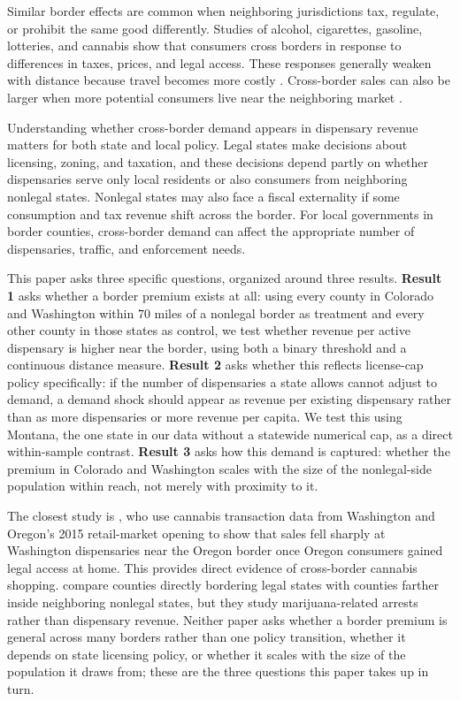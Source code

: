 \documentclass[12pt]{article}
\begin{document}
Similar border effects are common when neighboring jurisdictions tax, regulate, or prohibit the same good
differently. Studies of alcohol, cigarettes, gasoline, lotteries, and cannabis show that consumers cross
borders in response to differences in taxes, prices, and legal access. These responses generally weaken with
distance because travel becomes more costly \citep{AsplundFribergWilander2007,Lovenheim2008,BeattyLarsenSommervoll2009,ChandraHeadTappata2014,HansenMillerWeber2020}.
Cross-border sales can also be larger when more potential consumers live near the neighboring market
\citep{KnightSchiff2012,ChandraHeadTappata2014}.

Understanding whether cross-border demand appears in dispensary revenue matters for both state and local
policy. Legal states make decisions about licensing, zoning, and taxation, and these decisions depend partly
on whether dispensaries serve only local residents or also consumers from neighboring nonlegal states.
Nonlegal states may also face a fiscal externality if some consumption and tax revenue shift across the
border. For local governments in border counties, cross-border demand can affect the appropriate number of
dispensaries, traffic, and enforcement needs.

This paper asks three specific questions, organized around three results. \textbf{Result 1} asks whether a
border premium exists at all: using every county in Colorado and Washington within 70 miles of a nonlegal
border as treatment and every other county in those states as control, we test whether revenue per active
dispensary is higher near the border, using both a binary threshold and a continuous distance measure.
\textbf{Result 2} asks whether this reflects license-cap policy specifically: if the number of dispensaries a
state allows cannot adjust to demand, a demand shock should appear as revenue per existing dispensary rather
than as more dispensaries or more revenue per capita. We test this using Montana, the one state in our data
without a statewide numerical cap, as a direct within-sample contrast. \textbf{Result 3} asks how this demand
is captured: whether the premium in Colorado and Washington scales with the size of the nonlegal-side
population within reach, not merely with proximity to it.

The closest study is \citet{HansenMillerWeber2020}, who use cannabis transaction data from Washington and
Oregon's 2015 retail-market opening to show that sales fell sharply at Washington dispensaries near the
Oregon border once Oregon consumers gained legal access at home. This provides direct evidence of
cross-border cannabis shopping. \citet{HaoCowan2020} compare counties directly bordering legal states with
counties farther inside neighboring nonlegal states, but they study marijuana-related arrests rather than
dispensary revenue. Neither paper asks whether a border premium is general across many borders rather than
one policy transition, whether it depends on state licensing policy, or whether it scales with the size of
the population it draws from; these are the three questions this paper takes up in turn.
\end{document}
